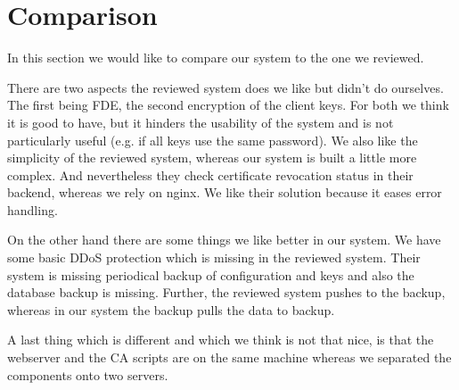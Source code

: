 \documentclass[english]{article}
\begin{document}
\section{Comparison} %

In this section we would like to compare our system to the one we reviewed.

There are two aspects the reviewed system does we like but didn't do ourselves. The first being FDE, the second encryption of the client keys. For both we think it is good to have, but it hinders the usability of the system and is not particularly useful (e.g. if all keys use the same password). We also like the simplicity of the reviewed system, whereas our system is built a little more complex. And nevertheless they check certificate revocation status in their backend, whereas we rely on nginx. We like their solution because it eases error handling.

On the other hand there are some things we like better in our system. We have some basic DDoS protection which is missing in the reviewed system. Their system is missing periodical backup of configuration and keys and also the database backup is missing. Further, the reviewed system pushes to the backup, whereas in our system the backup pulls the data to backup.

A last thing which is different and which we think is not that nice, is that the webserver and the CA scripts are on the same machine whereas we separated the components onto two servers.


\end{document}
